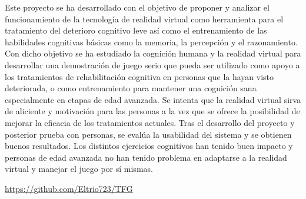 Este proyecto se ha desarrollado con el objetivo de proponer y analizar el funcionamiento de la tecnología de realidad virtual como herramienta para el tratamiento del deterioro cognitivo leve así como el entrenamiento de las habilidades cognitivas básicas como la memoria, la percepción y el razonamiento. Con dicho objetivo se ha estudiado la cognición humana y la realidad virtual para desarrollar una demostración de juego serio que pueda ser utilizado como apoyo a los tratamientos de rehabilitación cognitiva en personas que la hayan visto deteriorada, o como entrenamiento para mantener una cognición sana especialmente en etapas de edad avanzada. Se intenta que la realidad virtual sirva de aliciente y motivación para las personas a la vez que se ofrece la posibilidad de mejorar la eficacia de los tratamientos actuales. Tras el desarrollo del proyecto y posterior prueba con personas, se evalúa la usabilidad del sistema y se obtienen buenos resultados. Los distintos ejercicios cognitivos han tenido buen impacto y personas de edad avanzada no han tenido problema en adaptarse a la realidad virtual y manejar el juego por sí mismas. 



\url{https://github.com/Eltrio723/TFG}

\blankpage
